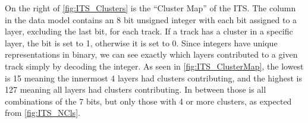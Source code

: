 On the right of \cref{fig:ITS_Clusters} is the ``Cluster Map'' of the ITS. The column in the data model contains an 8 bit unsigned integer with each bit assigned to a layer, excluding the last bit, for each track. If a track has a cluster in a specific layer, the bit is set to 1, otherwise it is set to 0. Since integers have unique representations in binary, we can see exactly which layers contributed to a given track simply by decoding the integer. As seen in \cref{fig:ITS_ClusterMap}, the lowest is 15 meaning the innermost 4 layers had clusters contributing, and the highest is 127 meaning all layers had clusters contributing. In between those is all combinations of the 7 bits, but only those with 4 or more clusters, as expected from \cref{fig:ITS_NCls}. 